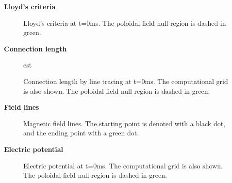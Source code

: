 \documentclass[10pt]{beamer}
\begin{document}
\begin{frame}{\bf Lloyd's criteria}
	\begin{figure}[htbp]
		\centering
		\hfill
		\caption{Lloyd's criteria at t=0ms. The poloidal field null region is dashed in green.}
	\end{figure}
\end{frame}



\begin{frame}{\bf Connection length}
	\begin{figure}[htbp]
		\centering
		\hfill
est
		\caption{Connection length by line tracing at t=0ms. The computational grid is also shown. The poloidal field null region is dashed in green.}
\end{figure}
\end{frame}


\begin{frame}{\bf Field lines}
	\begin{figure}[t]
		\centering
		\hfill

\caption{Magnetic field lines. The starting point is denoted with a black dot, and the ending point with a green dot.}
	\end{figure}	
\end{frame}


\begin{frame}{\bf Electric potential}
	\begin{figure}[htbp]
		\centering
		\hfill
		\centering
		\caption{Electric potential at t=0ms. The computational grid is also shown. The poloidal field null region is dashed in green.}
	\end{figure}
\end{frame}
\end{document}
